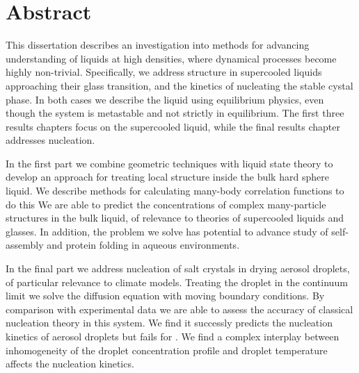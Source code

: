 \chapter*{Abstract}

This dissertation describes an investigation into methods for advancing understanding of liquids at high densities, where dynamical processes become highly non-trivial.
Specifically, we address structure in supercooled liquids approaching their glass transition, and the kinetics of nucleating the stable cystal phase.
In both cases we describe the liquid using equilibrium physics, even though the system is metastable and not strictly in equilibrium.
The first three results chapters focus on the supercooled liquid, while the final results chapter addresses nucleation.

In the first part we combine geometric techniques with liquid state theory to develop an approach for treating local structure inside the bulk hard sphere liquid.
We describe methods for calculating many-body correlation functions to do this
We are able to predict the concentrations of complex many-particle structures in the bulk liquid, of relevance to theories of supercooled liquids and glasses.
In addition, the problem we solve has potential to advance study of self-assembly and protein folding in aqueous environments.

In the final part we address nucleation of salt crystals in drying aerosol droplets, of particular relevance to climate models.
Treating the droplet in the continuum limit we solve the diffusion equation with moving boundary conditions.
By comparison with experimental data we are able to assess the accuracy of classical nucleation theory in this system.
We find it successly predicts the nucleation kinetics of  aerosol droplets but fails for .
We find a complex interplay between inhomogeneity of the droplet concentration profile and droplet temperature affects the nucleation kinetics.
